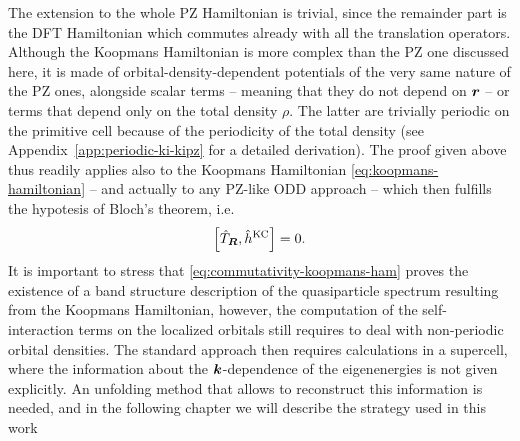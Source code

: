 The extension to the whole PZ Hamiltonian is trivial, since the remainder part is the DFT Hamiltonian which commutes already with all the translation operators. Although the Koopmans Hamiltonian is more complex than the PZ one discussed here, it is made of orbital-density-dependent potentials of the very same nature of the PZ ones, alongside scalar terms -- meaning that they do not depend on ${\bm r}$ -- or terms that depend only on the total density $\rho$. The latter are trivially periodic on the primitive cell because of the periodicity of the total density (see Appendix~\ref{app:periodic-ki-kipz} for a detailed derivation). The proof given above thus readily applies also to the Koopmans Hamiltonian \eqref{eq:koopmans-hamiltonian} -- and actually to any PZ-like ODD approach -- which then fulfills the hypotesis of Bloch's theorem, i.e.
%
\begin{equation}
    \left[ \hat{T}_{{\bm R}}, \hat{h}^{\rm KC} \right] = 0 .
    \label{eq:commutativity-koopmans-ham}
\end{equation}
%
It is important to stress that \cref{eq:commutativity-koopmans-ham} proves the existence of a band structure description of the quasiparticle spectrum resulting from the Koopmans Hamiltonian, however, the computation of the self-interaction terms on the localized orbitals still requires to deal with non-periodic orbital densities. The standard approach then requires calculations in a supercell, where the information about the ${\bm k}$-dependence of the eigenenergies is not given explicitly. An unfolding method that allows to reconstruct this information is needed, and in the following chapter we will describe the strategy used in this work

